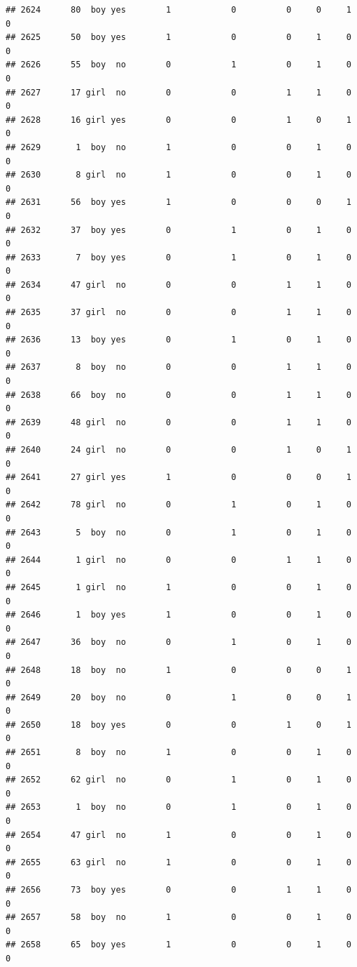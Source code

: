 \documentclass[man]{apa6}
\begin{document}
\begin{verbatim}
## 2624      80  boy yes        1            0          0     0     1     0
## 2625      50  boy yes        1            0          0     1     0     0
## 2626      55  boy  no        0            1          0     1     0     0
## 2627      17 girl  no        0            0          1     1     0     0
## 2628      16 girl yes        0            0          1     0     1     0
## 2629       1  boy  no        1            0          0     1     0     0
## 2630       8 girl  no        1            0          0     1     0     0
## 2631      56  boy yes        1            0          0     0     1     0
## 2632      37  boy yes        0            1          0     1     0     0
## 2633       7  boy yes        0            1          0     1     0     0
## 2634      47 girl  no        0            0          1     1     0     0
## 2635      37 girl  no        0            0          1     1     0     0
## 2636      13  boy yes        0            1          0     1     0     0
## 2637       8  boy  no        0            0          1     1     0     0
## 2638      66  boy  no        0            0          1     1     0     0
## 2639      48 girl  no        0            0          1     1     0     0
## 2640      24 girl  no        0            0          1     0     1     0
## 2641      27 girl yes        1            0          0     0     1     0
## 2642      78 girl  no        0            1          0     1     0     0
## 2643       5  boy  no        0            1          0     1     0     0
## 2644       1 girl  no        0            0          1     1     0     0
## 2645       1 girl  no        1            0          0     1     0     0
## 2646       1  boy yes        1            0          0     1     0     0
## 2647      36  boy  no        0            1          0     1     0     0
## 2648      18  boy  no        1            0          0     0     1     0
## 2649      20  boy  no        0            1          0     0     1     0
## 2650      18  boy yes        0            0          1     0     1     0
## 2651       8  boy  no        1            0          0     1     0     0
## 2652      62 girl  no        0            1          0     1     0     0
## 2653       1  boy  no        0            1          0     1     0     0
## 2654      47 girl  no        1            0          0     1     0     0
## 2655      63 girl  no        1            0          0     1     0     0
## 2656      73  boy yes        0            0          1     1     0     0
## 2657      58  boy  no        1            0          0     1     0     0
## 2658      65  boy yes        1            0          0     1     0     0

\end{verbatim}
\end{document}
